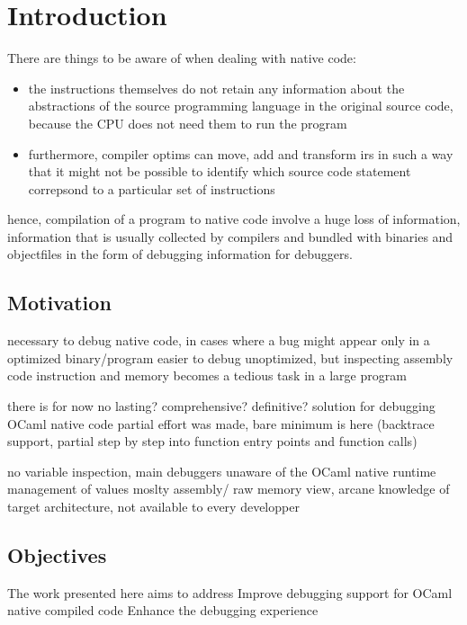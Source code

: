 \chapter{Introduction\label{cha:chapter1}}

There are things to be aware of when dealing with \gls{native} code:
\begin{itemize}
    \item the instructions themselves do not retain any information about the abstractions of the source programming language in the
original source code, because the CPU does not need them to run the program

\item furthermore, compiler \glspl{optim} can move, add and transform \glspl{ir} in such a way that it might not be possible to identify which source code statement correpsond to a particular set of instructions
\end{itemize}

hence, compilation of a program to native code involve a huge loss of information, information that is usually collected by compilers and bundled with binaries and \glspl{objectfile} in the form of debugging information for debuggers.

\section{Motivation\label{sec:moti}}

necessary to debug native code, in cases where a bug might appear only in a optimized binary/program
easier to debug unoptimized, but inspecting assembly code instruction and memory becomes a tedious task in a large program

there is for now no lasting? comprehensive? definitive? solution for debugging OCaml native code
partial effort was made, bare minimum is here (backtrace support, partial step by step into function entry points and function calls)

no variable inspection, main debuggers unaware of the OCaml native runtime management of values
moslty assembly/ raw memory view, arcane knowledge of target architecture, not available to every developper

\section{Objectives\label{sec:objective}}
The work presented here aims to address
Improve debugging support for OCaml native compiled code
Enhance the debugging experience

